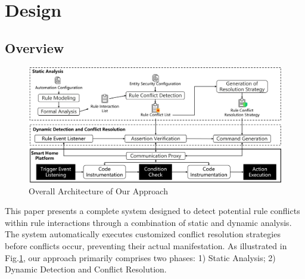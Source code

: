 \section{Design}

\subsection{Overview}
\begin{figure}[htbp]
	\centering
	\includegraphics[width=\textwidth]{figure/overall_design.png}
	\caption{Overall Architecture of Our Approach}
	\label{overall_design}
\end{figure}
This paper presents a complete system designed to detect potential rule conflicts within rule interactions through a combination of static and dynamic analysis. The system automatically executes customized conflict resolution strategies before conflicts occur, preventing their actual manifestation. As illustrated in Fig.\ref{overall_design}, our approach primarily comprises two phases: 1) Static Analysis; 2) Dynamic Detection and Conflict Resolution.

